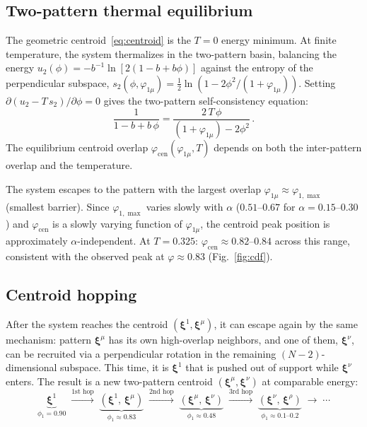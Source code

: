 \documentclass[11pt]{article}
\newcommand{\bxi}{\boldsymbol{\xi}}
\begin{document}
\subsection{Two-pattern thermal equilibrium}
\label{ssec:retrieval}

The geometric centroid~\eqref{eq:centroid} is the $T = 0$ energy minimum.  At finite temperature, the system thermalizes in the two-pattern basin, balancing the energy $u_2(\phi) = -b^{-1}\ln[2(1-b+b\phi)]$ against the entropy of the perpendicular subspace, $s_2(\phi, \varphi_{1\mu}) = \tfrac{1}{2}\ln(1 - 2\phi^2/(1+\varphi_{1\mu}))$.  Setting $\partial(u_2 - T\,s_2)/\partial\phi = 0$ gives the two-pattern self-consistency equation:
\begin{equation}
\frac{1}{1-b+b\,\phi} = \frac{2\,T\,\phi}{(1+\varphi_{1\mu}) - 2\phi^2}\,.
\label{eq:two_pat_sc}
\end{equation}
The equilibrium centroid overlap $\varphi_{\mathrm{cen}}(\varphi_{1\mu}, T)$ depends on both the inter-pattern overlap and the temperature.

The system escapes to the pattern with the largest overlap $\varphi_{1\mu} \approx \varphi_{1,\max}$ (smallest barrier).  Since $\varphi_{1,\max}$ varies slowly with $\alpha$ ($0.51$--$0.67$ for $\alpha = 0.15$--$0.30$) and $\varphi_{\mathrm{cen}}$ is a slowly varying function of $\varphi_{1\mu}$, the centroid peak position is approximately $\alpha$-independent.  At $T = 0.325$: $\varphi_{\mathrm{cen}} \approx 0.82$--$0.84$ across this range, consistent with the observed peak at $\varphi \approx 0.83$ (Fig.~\ref{fig:cdf}).

\subsection{Centroid hopping}
\label{ssec:hopping_theory}

After the system reaches the centroid $(\bxi^1, \bxi^\mu)$, it can escape again by the same mechanism: pattern $\bxi^\mu$ has its own high-overlap neighbors, and one of them, $\bxi^\nu$, can be recruited via a perpendicular rotation in the remaining $(N\!-\!2)$-dimensional subspace.  This time, it is $\bxi^1$ that is pushed out of support while $\bxi^\nu$ enters.  The result is a new two-pattern centroid $(\bxi^\mu, \bxi^\nu)$ at comparable energy:
\begin{equation}
\underbrace{\bxi^1}_{\phi_1 = 0.90}
\;\xrightarrow{\text{1st hop}}\;
\underbrace{(\bxi^1,\,\bxi^\mu)}_{\phi_1 \approx 0.83}
\;\xrightarrow{\text{2nd hop}}\;
\underbrace{(\bxi^\mu,\,\bxi^\nu)}_{\phi_1 \approx 0.48}
\;\xrightarrow{\text{3rd hop}}\;
\underbrace{(\bxi^\nu,\,\bxi^\rho)}_{\phi_1 \approx 0.1\text{--}0.2}
\;\to\; \cdots
\label{eq:hopping_chain}
\end{equation}
\end{document}
